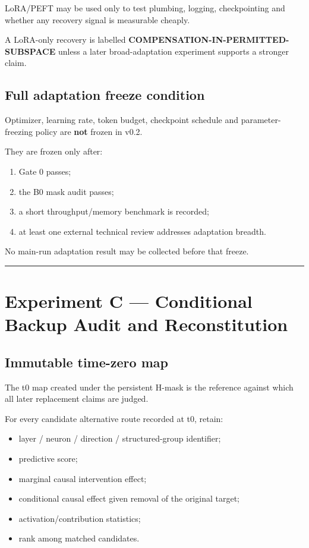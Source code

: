 LoRA/PEFT may be used only to test plumbing, logging, checkpointing and whether any recovery signal is measurable cheaply.

A LoRA-only recovery is labelled \textbf{COMPENSATION-IN-PERMITTED-SUBSPACE} unless a later broad-adaptation experiment supports a stronger claim.

\subsection{Full adaptation freeze condition}\label{full-adaptation-freeze-condition}

Optimizer, learning rate, token budget, checkpoint schedule and parameter-freezing policy are \textbf{not} frozen in v0.2.

They are frozen only after:

\begin{enumerate}
\def\labelenumi{\arabic{enumi}.}
\tightlist
\item
  Gate 0 passes;
\item
  the B0 mask audit passes;
\item
  a short throughput/memory benchmark is recorded;
\item
  at least one external technical review addresses adaptation breadth.
\end{enumerate}

No main-run adaptation result may be collected before that freeze.

\begin{center}\rule{0.5\linewidth}{0.5pt}\end{center}

\section{Experiment C --- Conditional Backup Audit and Reconstitution}\label{experiment-c-distinguishing-redundancy-from-reconstitution}

\subsection{Immutable time-zero map}\label{immutable-time-zero-map}

The t0 map created under the persistent H-mask is the reference against which all later replacement claims are judged.

For every candidate alternative route recorded at t0, retain:

\begin{itemize}
\tightlist
\item layer / neuron / direction / structured-group identifier;
\item predictive score;
\item marginal causal intervention effect;
\item conditional causal effect given removal of the original target;
\item activation/contribution statistics;
\item rank among matched candidates.
\end{itemize}

